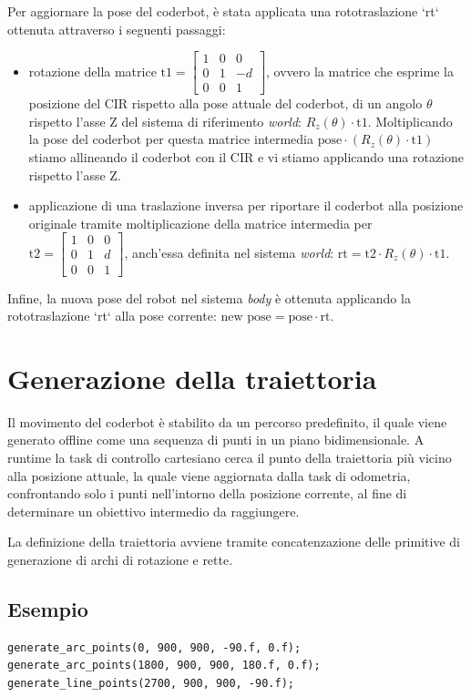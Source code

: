 \documentclass[11pt]{article}
\begin{document}
Per aggiornare la pose del coderbot, è stata applicata una rototraslazione `rt` ottenuta attraverso i seguenti passaggi:
\begin{itemize}
\item rotazione della matrice \(\text{t1}= \begin{bmatrix}1&0&0\\0&1&-d\\0&0&1\end{bmatrix}\), ovvero la matrice che esprime la posizione del CIR rispetto alla pose attuale del coderbot, di un angolo \(\theta\) rispetto l'asse Z del sistema di riferimento \emph{world}: \(R_z(\theta)\cdot\text{t1}\). Moltiplicando la pose del coderbot per questa matrice intermedia \(\text{pose}\cdot (R_z(\theta)\cdot\text{t1})\) stiamo allineando il coderbot con il CIR e vi stiamo applicando una rotazione rispetto l'asse Z.
\item applicazione di una traslazione inversa per riportare il coderbot alla posizione originale tramite moltiplicazione della matrice intermedia per \(\text{t2}= \begin{bmatrix}1&0&0\\0&1&d\\0&0&1\end{bmatrix}\), anch'essa definita nel sistema \emph{world}: \(\text{rt}=\text{t2}\cdot R_z(\theta)\cdot\text{t1}\).
\end{itemize}
Infine, la nuova pose del robot nel sistema \emph{body} è ottenuta applicando la rototraslazione `rt` alla pose corrente: \(\text{new pose} = \text{pose}\cdot\text{rt}\).
\section{Generazione della traiettoria}
\label{sec:org419c498}
Il movimento del coderbot è stabilito da un percorso predefinito, il quale viene generato offline come una sequenza di punti in un piano bidimensionale. A runtime la task di controllo cartesiano cerca il punto della traiettoria più vicino alla posizione attuale, la quale viene aggiornata dalla task di odometria, confrontando solo i punti nell'intorno della posizione corrente, al fine di determinare un obiettivo intermedio da raggiungere.

La definizione della traiettoria avviene tramite concatenzazione delle primitive di generazione di archi di rotazione e rette.
\subsection{Esempio}
\label{sec:orgfdceabc}
\begin{verbatim}
generate_arc_points(0, 900, 900, -90.f, 0.f);
generate_arc_points(1800, 900, 900, 180.f, 0.f);
generate_line_points(2700, 900, 900, -90.f);
\end{verbatim}
\end{document}
